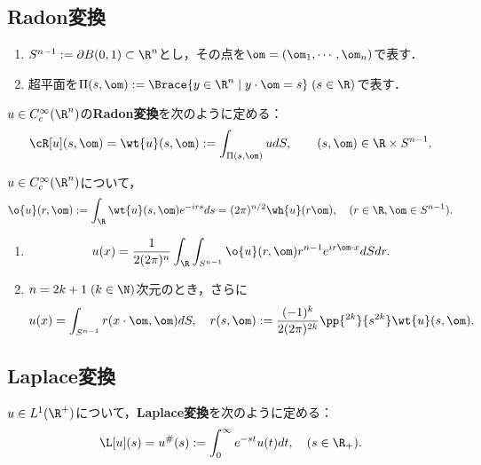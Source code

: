 \documentclass[uplatex,dvipdfmx]{jsreport}
\begin{document}
\subsection{Radon変換}

\begin{notation}\mbox{}
    \begin{enumerate}
        \item $S^{n-1}:=\partial B(0,1)\subset\R^n$とし，その点を$\om=(\om_1,\cdots,\om_n)$で表す．
        \item 超平面を$\Pi(s,\om):=\Brace{y\in\R^n\mid y\cdot\om=s}\;(s\in\R)$で表す．
    \end{enumerate}
\end{notation}

\begin{definition}
    $u\in C^\infty_c(\R^n)$の\textbf{Radon変換}を次のように定める：
    \[\cR[u](s,\om)=\wt{u}(s,\om):=\int_{\Pi(s,\om)}udS,\qquad(s,\om)\in\R\times S^{n-1}.\]
\end{definition}

\begin{theorem}[Radon変換とFourier変換の関係]
    $u\in C^\infty_c(\R^n)$について，
    \[\o{u}(r,\om):=\int_\R \wt{u}(s,\om)e^{-irs}ds=(2\pi)^{n/2}\wh{u}(r\om),\quad(r\in\R,\om\in S^{n-1}).\]
\end{theorem}

\begin{theorem}[Radon変換の反転公式]\mbox{}
    \begin{enumerate}
        \item \[u(x)=\frac{1}{2(2\pi)^n}\int_\R\int_{S^{n-1}}\o{u}(r,\om)r^{n-1}e^{ir\om\cdot x}dSdr.\]
        \item $n=2k+1\;(k\in\N)$次元のとき，さらに
        \[u(x)=\int_{S^{n-1}}r(x\cdot \om,\om)dS,\quad r(s,\om):=\frac{(-1)^k}{2(2\pi)^{2k}}\pp{^{2k}}{s^{2k}}\wt{u}(s,\om).\]
    \end{enumerate}
\end{theorem}

\subsection{Laplace変換}

\begin{definition}
    $u\in L^1(\R^+)$について，\textbf{Laplace変換}を次のように定める：
    \[\L[u](s)=u^\#(s):=\int^\infty_0e^{-st}u(t)dt,\quad (s\in\R_+).\]
\end{definition}
\end{document}
